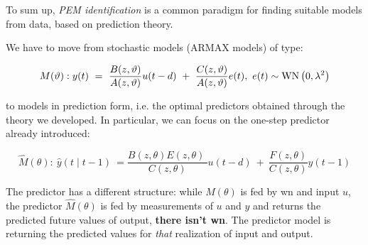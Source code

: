 

To sum up, \textit{PEM identification} is a common paradigm for finding suitable models from data, based on prediction theory.

We have to move from stochastic models (ARMAX models) of type: 

$$
M(\theta):
y(t) \ =\ \frac{B(z,\theta)}{A(z,\theta)} u(t-d) \ +\ \frac{C(z,\theta)}{A(z,\theta)} e(t) ,\ e(t)\sim \WN \left(0,\lambda ^{2}\right)
$$

to models in prediction form, i.e. the optimal predictors obtained through the theory we developed. In particular, we can focus on the one-step predictor already introduced:

$$
\hat{M}(\theta) :
\ \hat{y}(t\mid t-1) \ =\frac{B(z,\theta) E(z,\theta) \ }{C(z,\theta)} u(t-d) \ +\ \frac{F(z,\theta)}{C(z,\theta)} y(t-1)
$$

The predictor has a different structure: while $ M(\theta)$ is fed by \gls{wn} and input $u$, the predictor $\hat{M}(\theta)$ is fed by measurements of $u$ and $y$ and returns the predicted future values of output, \textbf{there isn't \gls{wn}}. The predictor model is returning the predicted values for \textit{that} realization of input and output.



